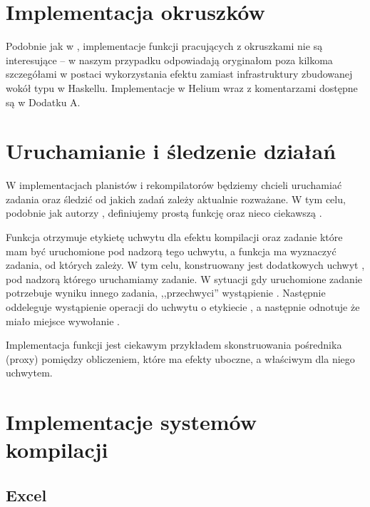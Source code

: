 \section{Implementacja okruszków}

Podobnie jak w \BSaLC{}, implementacje funkcji pracujących z okruszkami nie są interesujące -- w naszym przypadku odpowiadają oryginałom poza kilkoma szczegółami w postaci wykorzystania efektu  zamiast infrastruktury zbudowanej wokół typu  w Haskellu. Implementacje w Helium wraz z komentarzami dostępne są w Dodatku A.


\section{Uruchamianie i śledzenie działań}

W implementacjach planistów i rekompilatorów będziemy chcieli uruchamiać zadania oraz śledzić od jakich zadań zależy aktualnie rozważane. W tym celu, podobnie jak autorzy \BSaLC{}, definiujemy prostą funkcję  oraz nieco ciekawszą .



Funkcja  otrzymuje etykietę  uchwytu dla efektu kompilacji oraz zadanie  które mam być uruchomione pod nadzorą tego uchwytu, a funkcja ma wyznaczyć zadania, od których  zależy. W tym celu, konstruowany jest dodatkowych uchwyt , pod nadzorą którego uruchamiamy zadanie. W sytuacji gdy uruchomione zadanie potrzebuje wyniku innego zadania,  ,,przechwyci'' wystąpienie . Następnie oddeleguje wystąpienie operacji do uchwytu o etykiecie , a następnie odnotuje że miało miejsce wywołanie .

Implementacja funkcji  jest ciekawym przykładem skonstruowania pośrednika (proxy) pomiędzy obliczeniem, które ma efekty uboczne, a właściwym dla niego uchwytem.

\section{Implementacje systemów kompilacji}

\subsection{Excel}

